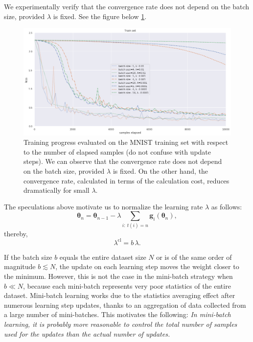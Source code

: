 \documentclass[12pt,a4paper]{amsart}
\numberwithin{equation}{section}
\theoremstyle{remark}
\begin{document}
We experimentally verify that the convergence rate does not depend on the batch size,
provided
$\lambda$
is fixed.
See the figure below
\ref{Fig: batch size and lambda}.
\begin{figure}
	\centering
	\includegraphics[width=16cm,keepaspectratio=true]{images/batch_size_and_lambda.png}
	\caption{
		Training progress evaluated on the MNIST training set
		with respect to the number of elapsed samples
		(do not confuse with update steps).
		We can observe that the convergence rate does not depend on the batch size,
		provided
		$\lambda$
		is fixed.
		On the other hand, the convergence rate, calculated in terms of the calculation cost,
		reduces dramatically for small
		$\lambda$.
	}
	\label{Fig: batch size and lambda}
\end{figure}

The speculations above motivate us to normalize the learning rate
$\lambda$
as follows:
$$
	\boldsymbol\theta_n =
	\boldsymbol\theta_{n-1} - \lambda \sum_{i:~ t(i) = n} \mathbf{g}_i(\boldsymbol\theta_n),
$$
thereby,
\begin{equation}
	\lambda^{\text{cl}} = b \, \lambda.
	\label{Formula: l^lc = b l}
\end{equation}

If the batch size
$b$
equals the entire dataset size
$N$
or is of the same order of magnitude
$b \lesssim N$,
the update on each learning step moves the weight closer to the minimum.
However, this is not the case in the mini-batch strategy when
$b \ll N$,
because each mini-batch represents very poor statistics of the entire dataset.
Mini-batch learning works due to the statistics averaging effect
after numerous learning step updates,
thanks to an aggregation of data collected from a large number of mini-batches.
This motivates the following:
\emph{
	In mini-batch learning,
	it is probably more reasonable to control the total number of samples used for the updates
	than the actual number of updates.
}
\end{document}
